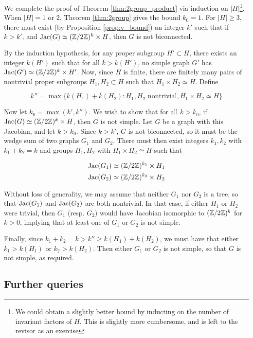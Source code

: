 \documentclass{amsart}
\begin{document}
We complete the proof of Theorem \ref{thm:2group_product} via
induction on $|H|$\footnote{We could obtain a slightly better bound by
  inducting on the number of invariant factors of $H$. This is
  slightly more cumbersome, and is left to the revisor as an
  exercise}. When $|H| = 1$ or $2$, Theorem \ref{thm:2group} gives the
bound $k_0 = 1$. For $|H| \ge 3$, there must exist (by Proposition
\ref{prop:v_bound}) an integer $k'$ such that if $k > k'$, and
$\operatorname{Jac}(G) \simeq (\mathbb{Z}/2\mathbb{Z})^k \times H$, then $G$ is not biconnected.

By the induction hypothesis, for any proper subgroup $H' \subset H$,
there exists an integer $k(H')$ such that for all $k > k(H')$, no
simple graph $G'$ has $\operatorname{Jac}(G') \simeq (\mathbb{Z}/2\mathbb{Z})^k \times H'$. Now,
since $H$ is finite, there are finitely many pairs of nontrivial
proper subgroups $H_1, H_2 \subset H$ such that $H_1 \times H_2 \simeq
H$. Define

\begin{equation}
  k'' = \max\{k(H_1) + k(H_2) : H_1, H_2 \textrm{ nontrivial}, H_1
  \times H_2 \simeq H\}
\end{equation}

Now let $k_0 = \max(k', k'')$. We wish to show that for all $k > k_0$,
if $\operatorname{Jac}(G) \simeq (\mathbb{Z}/2\mathbb{Z})^k \times H$, then $G$ is not simple. Let
$G$ be a graph with this Jacobian, and let $k > k_0$.  Since $k > k'$,
$G$ is not biconnected, so it must be the wedge sum of two graphs
$G_1$ and $G_2$. There must then exist integers $k_1, k_2$ with $k_1 +
k_2 = k$ and groups $H_1, H_2$ with $H_1 \times H_2 \simeq H$ such
that

\begin{align}
  \operatorname{Jac}(G_1) &\simeq (\mathbb{Z}/2\mathbb{Z})^{k_1} \times H_1 \\
  \operatorname{Jac}(G_2) &\simeq (\mathbb{Z}/2\mathbb{Z})^{k_2} \times H_2
\end{align}

Without loss of generality, we may assume that neither $G_1$ nor $G_2$
is a tree, so that $\operatorname{Jac}(G_1)$ and $\operatorname{Jac}(G_2)$ are both nontrivial. In
that case, if either $H_1$ or $H_2$ were trivial, then $G_1$
(resp. $G_2$) would have Jacobian isomorphic to $(\mathbb{Z}/2\mathbb{Z})^k$ for $k >
0$, implying that at least one of $G_1$ or $G_2$ is not simple.

Finally, since $k_1 + k_2 = k > k'' \ge k(H_1) + k(H_2)$, we must have
that either $k_1 > k(H_1)$ or $k_2 > k(H_2)$. Then either $G_1$ or
$G_2$ is not simple, so that $G$ is not simple, as required.

\subsection{Further queries} 
\end{document}
